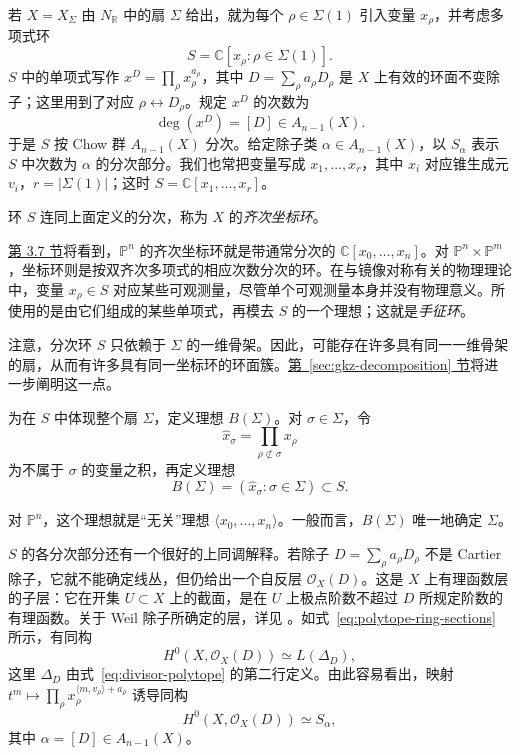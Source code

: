 若 $X=X_\Sigma$ 由 $N_{\mathbb R}$ 中的扇 $\Sigma$ 给出，就为每个 $\rho\in\Sigma(1)$ 引入变量 $x_\rho$，并考虑多项式环
\[
S=\mathbb C[x_\rho:\rho\in\Sigma(1)].
\]
$S$ 中的单项式写作 $x^D=\prod_\rho x_\rho^{a_\rho}$，其中 $D=\sum_\rho a_\rho D_\rho$ 是 $X$ 上有效的环面不变除子；这里用到了对应 $\rho\leftrightarrow D_\rho$。规定 $x^D$ 的次数为
\[
\deg(x^D)=[D]\in A_{n-1}(X).
\]
于是 $S$ 按 Chow 群 $A_{n-1}(X)$ 分次。给定除子类 $\alpha\in A_{n-1}(X)$，以 $S_\alpha$ 表示 $S$ 中次数为 $\alpha$ 的分次部分。我们也常把变量写成 $x_1,\ldots,x_r$，其中 $x_i$ 对应锥生成元 $v_i$，$r=|\Sigma(1)|$；这时 $S=\mathbb C[x_1,\ldots,x_r]$。

\begin{definition}\label{def:toric-homogeneous-ring}
环 $S$ 连同上面定义的分次，称为 $X$ 的\emph{齐次坐标环}。
\end{definition}

\hyperref[sec:toric-examples]{第 3.7 节}将看到，$\mathbb P^n$ 的齐次坐标环就是带通常分次的 $\mathbb C[x_0,\ldots,x_n]$。对 $\mathbb P^n\times\mathbb P^m$，坐标环则是按双齐次多项式的相应次数分次的环。在与镜像对称有关的物理理论中，变量 $x_\rho\in S$ 对应某些可观测量，尽管单个可观测量本身并没有物理意义。所使用的是由它们组成的某些单项式，再模去 $S$ 的一个理想；这就是\emph{手征环}。

注意，分次环 $S$ 只依赖于 $\Sigma$ 的一维骨架。因此，可能存在许多具有同一一维骨架的扇，从而有许多具有同一坐标环的环面簇。\hyperref[sec:gkz-decomposition]{第~\ref*{sec:gkz-decomposition} 节}将进一步阐明这一点。

为在 $S$ 中体现整个扇 $\Sigma$，定义理想 $B(\Sigma)$。对 $\sigma\in\Sigma$，令
\[
\widehat x_\sigma=\prod_{\rho\not\subset\sigma}x_\rho
\]
为不属于 $\sigma$ 的变量之积，再定义理想
\[
B(\Sigma)=(\widehat x_\sigma:\sigma\in\Sigma)\subset S.
\]

对 $\mathbb P^n$，这个理想就是“无关”理想 $\langle x_0,\ldots,x_n\rangle$。一般而言，$B(\Sigma)$ 唯一地确定 $\Sigma$。

$S$ 的各分次部分还有一个很好的上同调解释。若除子 $D=\sum_\rho a_\rho D_\rho$ 不是 Cartier 除子，它就不能确定线丛，但仍给出一个自反层 $\mathcal O_X(D)$。这是 $X$ 上有理函数层的子层：它在开集 $U\subset X$ 上的截面，是在 $U$ 上极点阶数不超过 $D$ 所规定阶数的有理函数。关于 Weil 除子所确定的层，详见 。如式~\eqref{eq:polytope-ring-sections} 所示，有同构
\[
H^0(X,\mathcal O_X(D))\simeq L(\Delta_D),
\]
这里 $\Delta_D$ 由式~\eqref{eq:divisor-polytope} 的第二行定义。由此容易看出，映射
$t^m\mapsto\prod_\rho x_\rho^{\langle m,v_\rho\rangle+a_\rho}$
诱导同构
\begin{equation}\label{eq:toric-graded-sections}
H^0(X,\mathcal O_X(D))\simeq S_\alpha,
\end{equation}
其中 $\alpha=[D]\in A_{n-1}(X)$。

